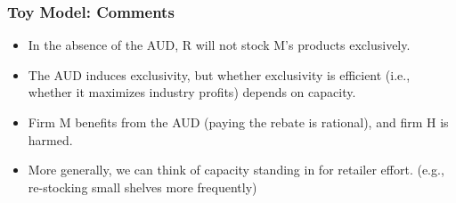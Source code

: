\begin{frame}
  \frametitle{Toy Model:  Comments}
\footnotesize
\begin{itemize}
\item In the absence of the AUD, R will not stock M's products exclusively.
\item The AUD induces exclusivity, but whether exclusivity is efficient (i.e., whether it maximizes industry profits) depends on capacity.
\item Firm M benefits from the AUD (paying the rebate is rational), and firm H is harmed.
\item More generally, we can think of capacity standing in for retailer effort.  (e.g., re-stocking small shelves more frequently)
\end{itemize}

\end{frame}


